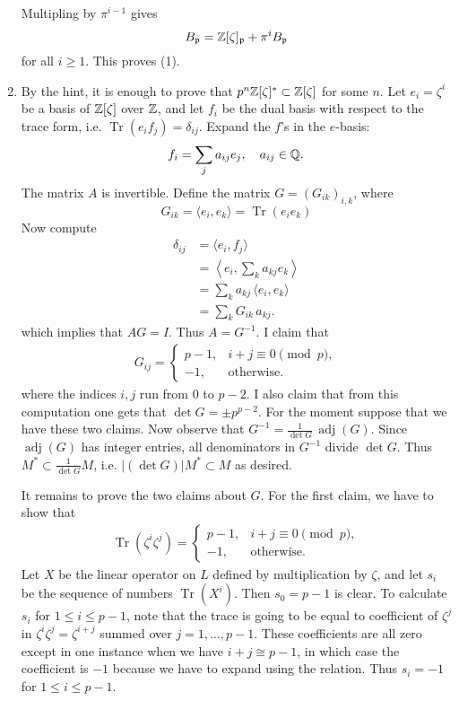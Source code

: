 \documentclass[12pt]{article}  %
\newcommand{\Tr}{\operatorname{Tr}}
\begin{document}
\begin{solution}
\begin{enumerate}
Multipling by $\pi^{i-1}$ gives \[
    B_{\mathfrak{p}} = \mathbb{Z}[\zeta]_{\mathfrak{p}} + \pi^i B_{\mathfrak{p}}\]
for all $i\geq 1$. This proves (1).
    \item By the hint, it is enough to prove that $p^n \mathbb{Z}[\zeta]^* \subset \mathbb{Z}[\zeta]$ for some $n$. Let $e_i = \zeta^i$ be a basis of $\mathbb{Z}[\zeta]$ over $\mathbb{Z}$, and let $f_i$ be the dual basis with respect to the trace form, i.e. $\Tr(e_i f_j) = \delta_{ij}$. Expand the $f$'s in the $e$-basis:
        \[f_i = \sum_j a_{ij} e_j, \quad a_{ij} \in \mathbb{Q}.\]
        The matrix $A$ is invertible. Define the matrix
$G=(G_{ik})_{i,k}$, where \[G_{ik}=\langle e_i,e_k\rangle=\operatorname{Tr}(e_ie_k)\]
Now compute
\begin{align*}
    \delta_{ij}
    &=\langle e_i,f_j\rangle \\
    &=\left\langle e_i,\sum_k a_{kj}e_k\right\rangle \\
    &=\sum_k a_{kj}\,\langle e_i,e_k\rangle \\
    &=\sum_k G_{ik}\,a_{kj}.
\end{align*}
which implies that $AG=I$. Thus $A=G^{-1}$. I claim that \begin{align*}
    G_{ij}=
\begin{cases}
p-1,& i+j\equiv 0\pmod p,\\
-1,& \text{otherwise}.
\end{cases}
\end{align*}
where the indices $i,j$ run from $0$ to $p-2$. I also claim that from this computation one gets that $\det G = \pm p^{p-2}$. For the moment suppose that we have these two claims. Now observe that $G^{-1} = \frac{1}{\det G}\,\operatorname{adj}(G)$.
Since $\operatorname{adj}(G)$ has integer entries, all denominators in $G^{-1}$ divide $\det G$. Thus $M^* \subset \frac{1}{\det G} M$, i.e. $|(\det G)| M^* \subset M$ as desired.

It remains to prove the two claims about $G$. For the first claim, we have to show that 
\begin{align*}
    \Tr(\zeta^i\zeta^j) = 
\begin{cases}
p-1,& i+j\equiv 0\pmod p,\\
-1,& \text{otherwise}.
\end{cases}
\end{align*}
Let $X$ be the linear operator on $L$ defined by multiplication by $\zeta$, and let $s_i$ be the sequence of numbers $\Tr(X^i)$. Then $s_0 = p-1$ is clear. To calculate $s_i$ for $1\leq i\leq p-1$, note that the trace is going to be equal to coefficient of $\zeta^j$ in $\zeta^i\zeta^j=\zeta^{i+j}$ summed over $j=1,\dots,p-1$. These coefficients are all zero except in one instance when we have $i+j \cong p-1$, in which case the coefficient is $-1$ because we have to expand using the relation. Thus $s_i = -1$ for $1\leq i\leq p-1$. 


\end{enumerate}
\end{solution}
\end{document}
